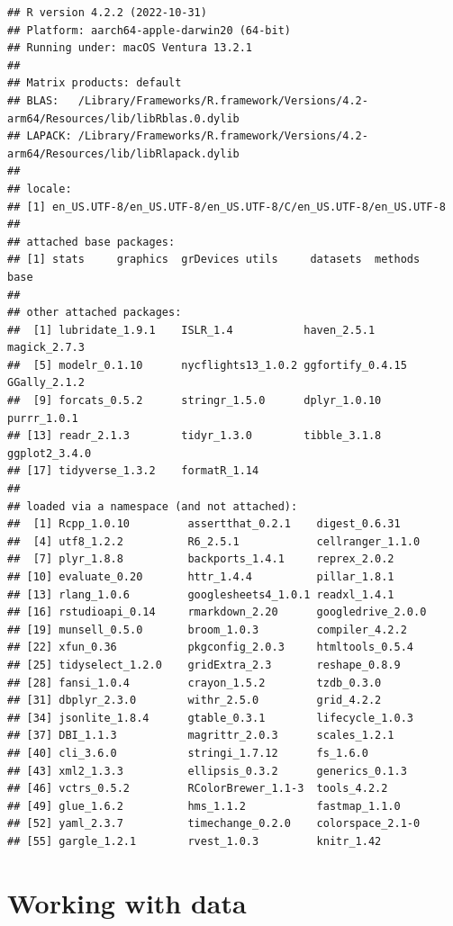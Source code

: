 \documentclass[
]{article}
\begin{document}
\begin{verbatim}
## R version 4.2.2 (2022-10-31)
## Platform: aarch64-apple-darwin20 (64-bit)
## Running under: macOS Ventura 13.2.1
## 
## Matrix products: default
## BLAS:   /Library/Frameworks/R.framework/Versions/4.2-arm64/Resources/lib/libRblas.0.dylib
## LAPACK: /Library/Frameworks/R.framework/Versions/4.2-arm64/Resources/lib/libRlapack.dylib
## 
## locale:
## [1] en_US.UTF-8/en_US.UTF-8/en_US.UTF-8/C/en_US.UTF-8/en_US.UTF-8
## 
## attached base packages:
## [1] stats     graphics  grDevices utils     datasets  methods   base     
## 
## other attached packages:
##  [1] lubridate_1.9.1    ISLR_1.4           haven_2.5.1        magick_2.7.3      
##  [5] modelr_0.1.10      nycflights13_1.0.2 ggfortify_0.4.15   GGally_2.1.2      
##  [9] forcats_0.5.2      stringr_1.5.0      dplyr_1.0.10       purrr_1.0.1       
## [13] readr_2.1.3        tidyr_1.3.0        tibble_3.1.8       ggplot2_3.4.0     
## [17] tidyverse_1.3.2    formatR_1.14      
## 
## loaded via a namespace (and not attached):
##  [1] Rcpp_1.0.10         assertthat_0.2.1    digest_0.6.31      
##  [4] utf8_1.2.2          R6_2.5.1            cellranger_1.1.0   
##  [7] plyr_1.8.8          backports_1.4.1     reprex_2.0.2       
## [10] evaluate_0.20       httr_1.4.4          pillar_1.8.1       
## [13] rlang_1.0.6         googlesheets4_1.0.1 readxl_1.4.1       
## [16] rstudioapi_0.14     rmarkdown_2.20      googledrive_2.0.0  
## [19] munsell_0.5.0       broom_1.0.3         compiler_4.2.2     
## [22] xfun_0.36           pkgconfig_2.0.3     htmltools_0.5.4    
## [25] tidyselect_1.2.0    gridExtra_2.3       reshape_0.8.9      
## [28] fansi_1.0.4         crayon_1.5.2        tzdb_0.3.0         
## [31] dbplyr_2.3.0        withr_2.5.0         grid_4.2.2         
## [34] jsonlite_1.8.4      gtable_0.3.1        lifecycle_1.0.3    
## [37] DBI_1.1.3           magrittr_2.0.3      scales_1.2.1       
## [40] cli_3.6.0           stringi_1.7.12      fs_1.6.0           
## [43] xml2_1.3.3          ellipsis_0.3.2      generics_0.1.3     
## [46] vctrs_0.5.2         RColorBrewer_1.1-3  tools_4.2.2        
## [49] glue_1.6.2          hms_1.1.2           fastmap_1.1.0      
## [52] yaml_2.3.7          timechange_0.2.0    colorspace_2.1-0   
## [55] gargle_1.2.1        rvest_1.0.3         knitr_1.42
\end{verbatim}

\hypertarget{working-with-data}{%
\section{Working with data}\label{working-with-data}}
\end{document}
